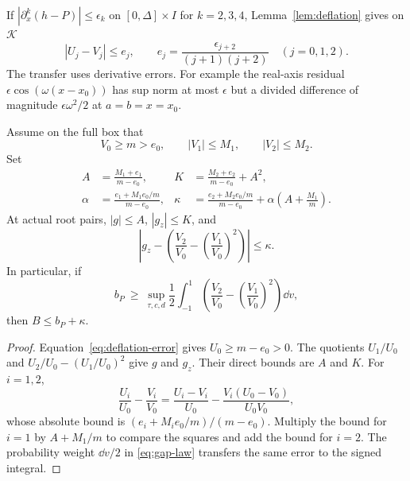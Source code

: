 If \(|\partial_x^k(h-P)|\le\epsilon_k\) on \([0,\Delta]\times I\) for
\(k=2,3,4\), Lemma~\ref{lem:deflation} gives on \(\mathcal K\)
\begin{equation}
\label{eq:deflation-error}
|U_j-V_j|\le e_j,\qquad
 e_j=\frac{\epsilon_{j+2}}{(j+1)(j+2)}\quad (j=0,1,2).
\end{equation}
The transfer uses derivative errors. For example the real-axis
residual \(\epsilon\cos(\omega(x-x_0))\) has sup norm at most
\(\epsilon\) but a divided difference of magnitude
\(\epsilon\omega^2/2\) at \(a=b=x=x_0\).

\begin{proposition}
\label{prop:force}
Assume on the full box that
\begin{equation}
\label{eq:model-floor}
V_0\ge m>e_0,\qquad |V_1|\le M_1,\qquad |V_2|\le M_2.
\end{equation}
Set
\begin{equation}
\label{eq:force-constants}
\begin{aligned}
A&=\frac{M_1+e_1}{m-e_0},&
K&=\frac{M_2+e_2}{m-e_0}+A^2,\\
\alpha&=\frac{e_1+M_1e_0/m}{m-e_0},&
\kappa&=\frac{e_2+M_2e_0/m}{m-e_0}
     +\alpha\left(A+\frac{M_1}{m}\right).
\end{aligned}
\end{equation}
At actual root pairs, \(|g|\le A\), \(|g_z|\le K\), and
\[
\left|g_z-\left(\frac{V_2}{V_0}-\left(\frac{V_1}{V_0}\right)^2\right)\right|
\le\kappa .
\]
In particular, if
\begin{equation}
\label{eq:signed-model}
 b_P\ \ge\
 \sup_{\tau,c,d}\frac12\int_{-1}^1
 \left(\frac{V_2}{V_0}-\left(\frac{V_1}{V_0}\right)^2\right)\dd v ,
\end{equation}
then \(B\le b_P+\kappa\).
\end{proposition}

\begin{proof}
Equation~\eqref{eq:deflation-error} gives \(U_0\ge m-e_0>0\).
The quotients \(U_1/U_0\) and \(U_2/U_0-(U_1/U_0)^2\) give
\(g\) and \(g_z\). Their direct bounds are \(A\) and \(K\).
For \(i=1,2\),
\[
\frac{U_i}{U_0}-\frac{V_i}{V_0}
=\frac{U_i-V_i}{U_0}-\frac{V_i(U_0-V_0)}{U_0V_0},
\]
whose absolute bound is \((e_i+M_i e_0/m)/(m-e_0)\).
Multiply the bound for \(i=1\) by \(A+M_1/m\) to compare the
squares and add the bound for \(i=2\). The probability weight
\(\dd v/2\) in \eqref{eq:gap-law} transfers the same error to
the signed integral.
\end{proof}


